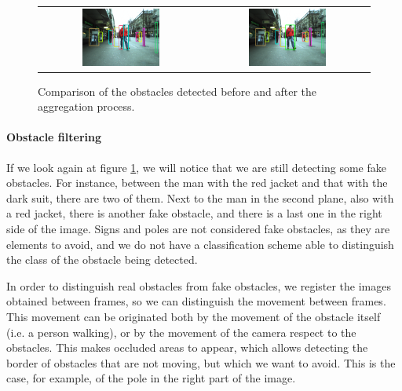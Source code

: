\begin{figure}[h!]
\begin{tabular}{cc}
\includegraphics[width=0.49\textwidth]{obstaclesBeforeAggregation}\label{fig:cp04_before_aggregation} &
\includegraphics[width=0.49\textwidth]{obstaclesAggregated}\label{fig:cp04_after_aggregation}
\end{tabular}
\caption{Comparison of the obstacles detected before and after the aggregation process.}\label{fig:cp04_clustering_aggregation}
\end{figure}

\paragraph{Obstacle filtering}\label{ch:chapter04_01_04_01_02}

If we look again at figure \ref{fig:cp04_clustering_aggregation}, we will notice that we are still detecting some fake obstacles. For instance, between the man with the red jacket and that with the dark suit, there are two of them. Next to the man in the second plane, also with a red jacket, there is another fake obstacle, and there is a last one in the right side of the image. Signs and poles are not considered fake obstacles, as they are elements to avoid, and we do not have a classification scheme able to distinguish the class of the obstacle being detected.

In order to distinguish real obstacles from fake obstacles, we register the images obtained between frames, so we can distinguish the movement between frames. This movement can be originated both by the movement of the obstacle itself (i.e. a person walking), or by the movement of the camera respect to the obstacles. This makes occluded areas to appear, which allows detecting the border of obstacles that are not moving, but which we want to avoid. This is the case, for example, of the pole in the right part of the image.

